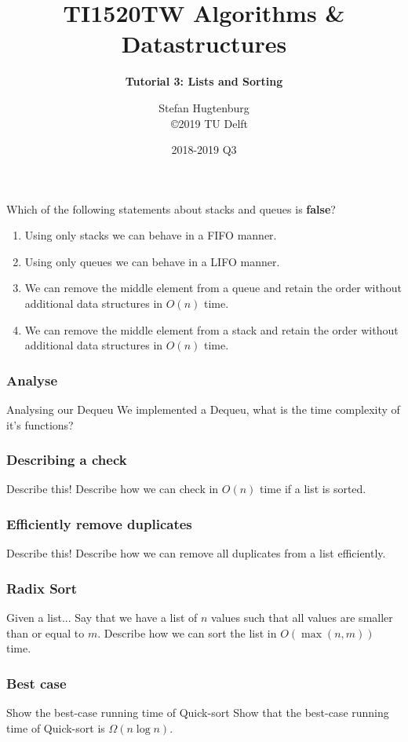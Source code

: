 \documentclass[aspectratio=169]{beamer}
\title[Algorithms \& Datastructures]{TI1520TW Algorithms \& Datastructures}
\subtitle{\color{cyan} \textbf{Tutorial 3: Lists and Sorting}}
\author{Stefan Hugtenburg\\ {\tiny{\qquad~~\copyright 2019 TU Delft}}}
\institute{CSE Teaching Teacm | EEMCS | TU Delft}
\date{2018-2019 Q3}
\begin{document}
\frame{\titlepage}

\begin{frame}
	\frametitle{}
	\begin{questionblock}{}
	Which of the following statements about stacks and queues is \textbf{false}?
	\begin{enumerate}
		\item Using only stacks we can behave in a FIFO manner.
		\item Using only queues we can behave in a LIFO manner.
		\item We can remove the middle element from a queue and retain the order without additional data structures in $O(n)$ time.
		\item We can remove the middle element from a stack and retain the order without additional data structures in $O(n)$ time.
	\end{enumerate}
	\end{questionblock}
	
\end{frame}

\begin{frame}
	\frametitle{Analyse}
	\begin{questionblock}{Analysing our Dequeu}
		We implemented a Dequeu, what is the time complexity of it's functions?
	\end{questionblock}
\end{frame}

\begin{frame}
	\frametitle{Describing a check}
	\begin{questionblock}{Describe this!}
		Describe how we can check in $O(n)$ time if a list is sorted.
	\end{questionblock}
\end{frame}

\begin{frame}
	\frametitle{Efficiently remove duplicates}
	\begin{questionblock}{Describe this!}
		Describe how we can remove all duplicates from a list efficiently.
	\end{questionblock}
\end{frame}

\begin{frame}
	\frametitle{Radix Sort}
	\begin{questionblock}{Given a list...}
		Say that we have a list of $n$ values such that all values are smaller than or equal to $m$. Describe how we can
		sort the list in $O(\max(n,m))$ time.
	\end{questionblock}
	
\end{frame}

\begin{frame}
	\frametitle{Best case}
	\begin{questionblock}{Show the best-case running time of Quick-sort}
		Show that the best-case running time of Quick-sort is $\Omega(n \log n)$.
	\end{questionblock}
\end{frame}


\frame{\titlepage}
\end{document}
